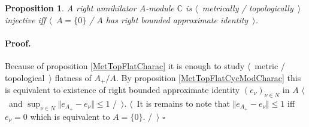 \documentclass[12pt]{article}
\newtheorem{proposition}[theorem]{Proposition}
\renewenvironment{proof}{\paragraph{Proof.}}{\hfill$\square$\medskip}
\begin{document}
\begin{proposition}\label{MetTopInjModCCharac} A right annihilator $A$-module $\mathbb{C}$ is $\langle$~metrically / topologically~$\rangle$ injective iff $\langle$~$A=\{0\}$ / $A$ has right bounded approximate identity~$\rangle$.
\end{proposition}
\begin{proof} Because of proposition \ref{MetTopFlatCharac} it is enough to study $\langle$~metric / topological~$\rangle$ flatness of $A_+/A$. By proposition \ref{MetTopFlatCycModCharac} this is equivalent to existence of right bounded approximate identity $(e_\nu)_{\nu\in N}$ in $A$ $\langle$~and $\sup_{\nu\in N}\Vert e_{A_+}-e_\nu\Vert\leq 1$ /~$\rangle$. $\langle$~It is remains to note that $\Vert e_{A_+}-e_\nu\Vert\leq 1$ iff $e_\nu=0$ which is equivalent to $A=\{0\}$. /~$\rangle$
\end{proof}
\end{document}
